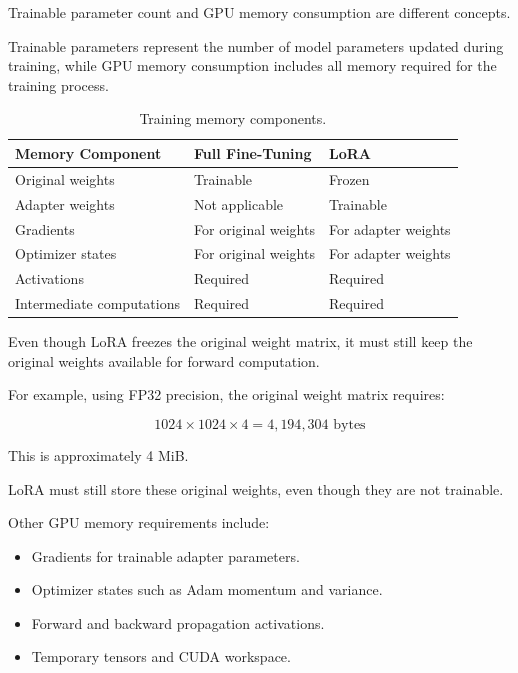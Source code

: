 Trainable parameter count and GPU memory consumption are different concepts.

Trainable parameters represent the number of model parameters updated during training, while GPU memory consumption includes all memory required for the training process.

\begin{table}[H]
\centering
\small
\caption{Training memory components.}
\label{tab:memory-components}
\renewcommand{\arraystretch}{1.15}
\begin{tabularx}{\textwidth}{@{}>{\raggedright\arraybackslash}p{}>{\raggedright\arraybackslash}X>{\raggedright\arraybackslash}X@{}}
\toprule
Memory Component & Full Fine-Tuning & LoRA \\
\midrule
Original weights & Trainable & Frozen \\
Adapter weights & Not applicable & Trainable \\
Gradients & For original weights & For adapter weights \\
Optimizer states & For original weights & For adapter weights \\
Activations & Required & Required \\
Intermediate computations & Required & Required \\
\bottomrule
\end{tabularx}
\end{table}

Even though LoRA freezes the original weight matrix, it must still keep the original weights available for forward computation.

For example, using FP32 precision, the original weight matrix requires:

\[
1024 \times 1024 \times 4 = 4,194,304 \text{ bytes}
\]

This is approximately 4 MiB.

LoRA must still store these original weights, even though they are not trainable.

Other GPU memory requirements include:

\begin{itemize}
\item Gradients for trainable adapter parameters.
\item Optimizer states such as Adam momentum and variance.
\item Forward and backward propagation activations.
\item Temporary tensors and CUDA workspace.
\end{itemize}

